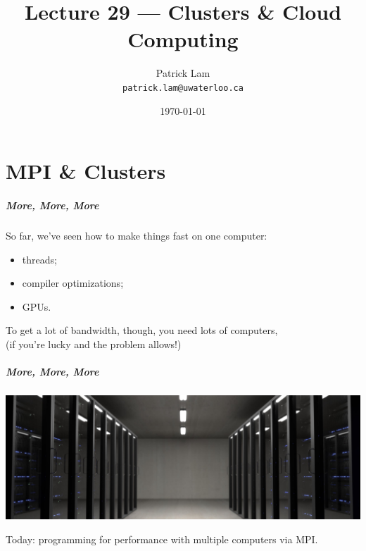 

\title{Lecture 29 --- Clusters \& Cloud Computing}

\author{Patrick Lam \\ \small \texttt{patrick.lam@uwaterloo.ca}}
\date{\today}




\begin{frame}
  \titlepage

 \end{frame}


\part{MPI \& Clusters}
\frame{\partpage}


\begin{frame}
  \frametitle{More, More, More}

  

  So far, we've seen how to make things fast on one computer:
\begin{itemize}
\item threads;
\item compiler optimizations;
\item GPUs.
\end{itemize}
  To get a lot of bandwidth, though, you need lots of computers, \\
   \qquad (if you're lucky and the problem allows!)\\[1em]
   
\end{frame}


\begin{frame}
  \frametitle{More, More, More}
  
  \begin{center}
	\includegraphics[width= \textwidth]{images/servers.jpeg}
\end{center}

  Today: programming for performance with multiple computers via MPI.

  
\end{frame}

